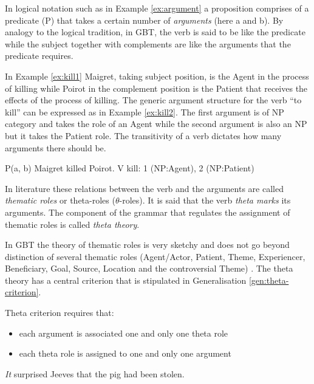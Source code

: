 In logical notation such as in Example \ref{ex:argument} a proposition comprises of a predicate (P) that takes a certain number of \textit{arguments} (here a and b). By analogy to the logical tradition, in GBT, the verb is said to be like the predicate while the subject together with complements are like the arguments that the predicate requires. 

In Example \ref{ex:kill1} Maigret, taking subject position, is the Agent in the process of killing while Poirot in the complement position is the Patient that receives the effects of the process of killing. The generic argument structure for the verb ``to kill'' can be expressed as in Example \ref{ex:kill2}. The first argument is of NP category and takes the role of an Agent while the second argument is also an NP but it takes the Patient role. The transitivity of a verb dictates how many arguments there should be.

\begin{exe}
    \ex\label{ex:argument} P(a, b)
    \ex\label{ex:kill1} Maigret killed Poirot.
    \ex\label{ex:kill2} V kill: 1 (NP:Agent), 2 (NP:Patient)
\end{exe}

In literature these relations between the verb and the arguments are called \textit{thematic roles} or theta-roles ($\theta$-roles). It is said that the verb \textit{theta marks} its arguments. The component of the grammar that regulates the assignment of thematic roles is called \textit{theta theory}. 

In GBT the theory of thematic roles is very sketchy and does not go beyond distinction of several thematic roles (Agent/Actor, Patient, Theme, Experiencer, Beneficiary, Goal, Source, Location and the controversial Theme) \citep[50]{Haegeman1991}. The theta theory has a central criterion that is stipulated in Generalisation \ref{gen:theta-criterion}.

\begin{generalization}\label{gen:theta-criterion}
    Theta criterion requires that: 
    \begin{itemize}
        \item each argument is associated one and only one theta role
        \item each theta role is assigned to one and only one argument \citep[54]{Haegeman1991}
    \end{itemize} 
\end{generalization}

\begin{exe}
    \ex\label{ex:expletive1} \textit{It} surprised Jeeves that the pig had been stolen.
\end{exe}

